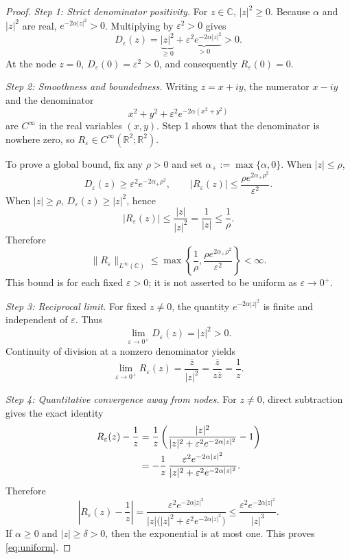 \documentclass[11pt]{article}
\newcommand{\C}{\mathbb{C}}
\newcommand{\R}{\mathbb{R}}
\newcommand{\eps}{\varepsilon}
\newcommand{\Reps}{R_{\eps}}
\newcommand{\Deps}{D_{\eps}}
\newcommand{\aPlus}{\alpha_{+}}
\begin{document}
\begin{proof}
\emph{Step 1: Strict denominator positivity.}
For $z\in\C$, $|z|^2\ge0$. Because $\alpha$ and $|z|^2$ are real,
$e^{-2\alpha|z|^2}>0$. Multiplying by $\eps^2>0$ gives
\[
\Deps(z)=\underbrace{|z|^2}_{\ge0}
+\underbrace{\eps^2e^{-2\alpha|z|^2}}_{>0}>0.
\]
At the node $z=0$, $\Deps(0)=\eps^2>0$, and consequently
$\Reps(0)=0$.

\emph{Step 2: Smoothness and boundedness.}
Writing $z=x+iy$, the numerator $x-iy$ and the denominator
\[
x^2+y^2+\eps^2e^{-2\alpha(x^2+y^2)}
\]
are $C^\infty$ in the real variables $(x,y)$. Step 1 shows that the
denominator is nowhere zero, so $\Reps\in C^\infty(\R^2;\R^2)$.

To prove a global bound, fix any $\rho>0$ and set
$\aPlus:=\max\{\alpha,0\}$. When $|z|\le\rho$,
\[
\Deps(z)\ge \eps^2e^{-2\aPlus\rho^2},
\qquad
|\Reps(z)|\le
\frac{\rho e^{2\aPlus\rho^2}}{\eps^2}.
\]
When $|z|\ge\rho$, $\Deps(z)\ge|z|^2$, hence
\[
|\Reps(z)|\le\frac{|z|}{|z|^2}
=\frac1{|z|}\le\frac1\rho.
\]
Therefore
\begin{equation}\label{eq:globalbound}
\|\Reps\|_{L^\infty(\C)}
\le\max\!\left\{\frac1\rho,
\frac{\rho e^{2\aPlus\rho^2}}{\eps^2}\right\}<\infty.
\end{equation}
This bound is for each fixed $\eps>0$; it is not asserted to be
uniform as $\eps\to0^+$.

\emph{Step 3: Reciprocal limit.}
For fixed $z\ne0$, the quantity $e^{-2\alpha|z|^2}$ is finite and
independent of $\eps$. Thus
\[
\lim_{\eps\to0^+}\Deps(z)=|z|^2>0.
\]
Continuity of division at a nonzero denominator yields
\[
\lim_{\eps\to0^+}\Reps(z)
=\frac{\overline z}{|z|^2}
=\frac{\overline z}{z\overline z}
=\frac1z.
\]

\emph{Step 4: Quantitative convergence away from nodes.}
For $z\ne0$, direct subtraction gives the exact identity
\begin{align}
\Reps(z)-\frac1z
&=\frac1z\left(
\frac{|z|^2}{|z|^2+\eps^2e^{-2\alpha|z|^2}}-1\right)
\notag\\
&=-\frac1z\,
\frac{\eps^2e^{-2\alpha|z|^2}}
{|z|^2+\eps^2e^{-2\alpha|z|^2}}.
\label{eq:exactdifference}
\end{align}
Therefore
\begin{equation}\label{eq:error}
\left|\Reps(z)-\frac1z\right|
=\frac{\eps^2e^{-2\alpha|z|^2}}
{|z|\bigl(|z|^2+\eps^2e^{-2\alpha|z|^2}\bigr)}
\le\frac{\eps^2e^{-2\alpha|z|^2}}{|z|^3}.
\end{equation}
If $\alpha\ge0$ and $|z|\ge\delta>0$, then the exponential is at
most one. This proves \eqref{eq:uniform}.


\end{proof}
\end{document}
